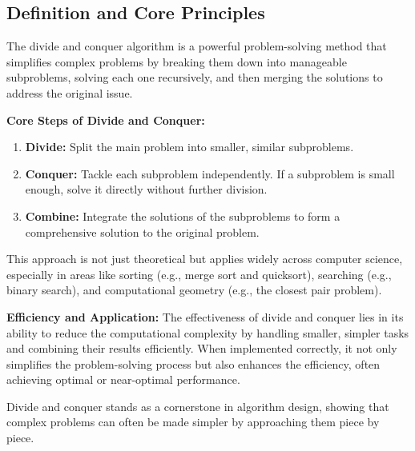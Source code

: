 \documentclass[12pt]{book} %
\begin{document}
\subsection{Definition and Core Principles}

The divide and conquer algorithm is a powerful problem-solving method that simplifies complex problems by breaking them down into manageable subproblems, solving each one recursively, and then merging the solutions to address the original issue.

\textbf{Core Steps of Divide and Conquer:}
\begin{enumerate}
    \item \textbf{Divide:} Split the main problem into smaller, similar subproblems.
    \item \textbf{Conquer:} Tackle each subproblem independently. If a subproblem is small enough, solve it directly without further division.
    \item \textbf{Combine:} Integrate the solutions of the subproblems to form a comprehensive solution to the original problem.
\end{enumerate}

This approach is not just theoretical but applies widely across computer science, especially in areas like sorting (e.g., merge sort and quicksort), searching (e.g., binary search), and computational geometry (e.g., the closest pair problem). 

\textbf{Efficiency and Application:}
The effectiveness of divide and conquer lies in its ability to reduce the computational complexity by handling smaller, simpler tasks and combining their results efficiently. When implemented correctly, it not only simplifies the problem-solving process but also enhances the efficiency, often achieving optimal or near-optimal performance.

Divide and conquer stands as a cornerstone in algorithm design, showing that complex problems can often be made simpler by approaching them piece by piece.
\end{document}
